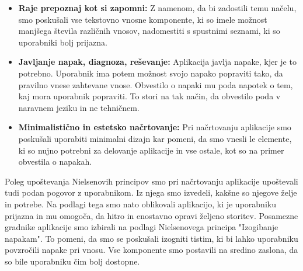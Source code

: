 \documentclass{article}
\begin{document}
\begin {itemize}
    \item \textbf{Raje prepoznaj kot si zapomni:} Z namenom, da bi zadostili temu načelu, smo poskušali vse tekstovno vnosne komponente, ki so imele možnost manjšega števila različnih vnosov, nadomestiti s spustnimi seznami, ki so uporabniki bolj prijazna.
    \item \textbf{Javljanje napak, diagnoza, reševanje:} Aplikacija javlja napake, kjer je to potrebno. Uporabnik ima potem možnost svojo napako popraviti tako, da pravilno vnese zahtevane vnose. Obvestilo o napaki mu poda napotek o tem, kaj mora uporabnik popraviti. To stori na tak način, da obvestilo poda v naravnem jeziku in ne tehničnem.
    \item \textbf{Minimalistično in estetsko načrtovanje:} Pri načrtovanju aplikacije smo poskušali uporabiti minimalni dizajn kar pomeni, da smo vnesli le elemente, ki so nujno potrebni za delovanje aplikacije in vse ostale, kot so na primer obvestila o napakah.
\end{itemize}

Poleg upoštevanja Nielsenovih principov smo pri načrtovanju aplikacije upoštevali tudi podan pogovor z uporabnikom. Iz njega smo izvedeli, kakšne so njegove želje in potrebe. Na podlagi tega smo nato oblikovali aplikacijo, ki je uporabniku prijazna in mu omogoča, da hitro in enostavno opravi željeno storitev. Posamezne gradnike aplikacije smo izbirali na podlagi Nielsenovega principa "Izogibanje napakam". To pomeni, da smo se poskušali izogniti tistim, ki bi lahko uporabniku povzročili napake pri vnosu. Vse komponente smo postavili na sredino zaslona, da so bile uporabniku čim bolj dostopne.
\end{document}
